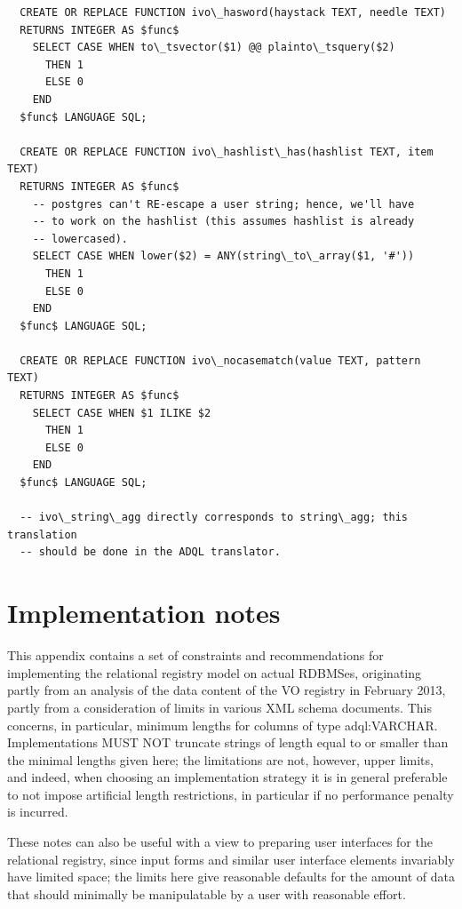 \documentclass[11pt,a4paper]{ivoa}
\begin{document}
\begin{verbatim}
  CREATE OR REPLACE FUNCTION ivo\_hasword(haystack TEXT, needle TEXT)
  RETURNS INTEGER AS $func$
    SELECT CASE WHEN to\_tsvector($1) @@ plainto\_tsquery($2) 
      THEN 1 
      ELSE 0 
    END
  $func$ LANGUAGE SQL;

  CREATE OR REPLACE FUNCTION ivo\_hashlist\_has(hashlist TEXT, item TEXT)
  RETURNS INTEGER AS $func$
    -- postgres can't RE-escape a user string; hence, we'll have
    -- to work on the hashlist (this assumes hashlist is already
    -- lowercased).
    SELECT CASE WHEN lower($2) = ANY(string\_to\_array($1, '#'))
      THEN 1 
      ELSE 0 
    END
  $func$ LANGUAGE SQL;

  CREATE OR REPLACE FUNCTION ivo\_nocasematch(value TEXT, pattern TEXT)
  RETURNS INTEGER AS $func$
    SELECT CASE WHEN $1 ILIKE $2
      THEN 1 
      ELSE 0 
    END
  $func$ LANGUAGE SQL;

  -- ivo\_string\_agg directly corresponds to string\_agg; this translation
  -- should be done in the ADQL translator.
\end{verbatim}




\section{Implementation notes}

\label{appBP}

This appendix contains a set of constraints and recommendations for
implementing the relational registry model on actual RDBMSes, originating
partly from an analysis of the data content of the VO registry in February
2013, partly from a consideration of limits in various XML schema documents.
This concerns, in particular, minimum lengths for columns of type
adql:VARCHAR.  Implementations MUST NOT truncate strings of length equal
to or smaller than the minimal lengths given here; the limitations are
not, however, upper limits, and indeed, when choosing an implementation
strategy it is in general preferable to not impose artificial length
restrictions, in particular if no performance penalty is incurred.

These notes can also be useful with a view to preparing user interfaces for
the relational registry, since input forms and similar user interface
elements invariably have limited space; the limits here give reasonable
defaults for the amount of data that should minimally be manipulatable
by a user with reasonable effort.
\end{document}
